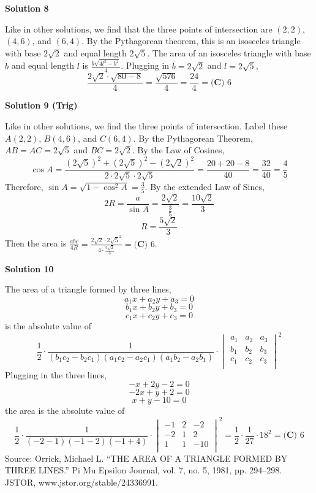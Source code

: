 \begin{enumerate}
\textbf{Solution 8}

Like in other solutions, we find that the three points of intersection are $(2, 2)$, $(4, 6)$, and $(6, 4)$. By the Pythagorean theorem, this is an isosceles triangle with base $2\sqrt2$ and equal length $2\sqrt5$. The area of an isosceles triangle with base $b$ and equal length $l$ is $\frac{b\sqrt{4l^2-b^2}}{4}$. Plugging  in $b = 2\sqrt2$ and $l = 2\sqrt5$,
 \[\frac{2\sqrt2 \cdot \sqrt{80-8}}{4} = \frac{\sqrt{576}}{4} = \frac{24}{4} = \boxed{\textbf{(C) }6}\]




\textbf{Solution 9 (Trig)}

Like in other solutions, we find the three points of intersection. Label these $A (2, 2)$, $B (4, 6)$, and $C (6, 4)$. By the Pythagorean Theorem, $AB = AC = 2\sqrt5$ and $BC = 2\sqrt2$. By the Law of Cosines,
 \[\cos A = \frac{(2\sqrt5)^2 + (2\sqrt5)^2 - (2\sqrt2)^2}{2 \cdot 2\sqrt5 \cdot 2\sqrt5} = \frac{20 + 20 - 8}{40} = \frac{32}{40} = \frac45\]Therefore, $\sin A = \sqrt{1 - \cos^2 A} = \frac35$. By the extended Law of Sines,
 \[2R = \frac{a}{\sin A} = \frac{2\sqrt2}{\frac35} = \frac{10\sqrt2}{3}\]
 \[R = \frac{5\sqrt2}{3}\]Then the area is $\frac{abc}{4R} = \frac{2\sqrt2 \cdot 2\sqrt5^2}{4 \cdot \frac{5\sqrt2}{3}} = \boxed{\textbf{(C) }6}$.

 



\textbf{Solution 10}

The area of a triangle formed by three lines,
 \[a_1x + a_2y + a_3 = 0\]
 \[b_1x + b_2y + b_3 = 0\]
 \[c_1x + c_2y + c_3 = 0\]is the absolute value of
 \[\frac12 \cdot \frac{1}{(b_1c_2-b_2c_1)(a_1c_2-a_2c_1)(a_1b_2-a_2b_1)} \cdot \begin{vmatrix} a_1&a_2&a_3\\ b_1&b_2&b_3\\ c_1&c_2&c_3\\ \end{vmatrix}^2\]Plugging in the three lines,
 \[-x + 2y - 2 = 0\]
 \[-2x + y + 2 = 0\]
 \[x + y - 10 = 0\]the area is the absolute value of
 \[\frac12 \cdot \frac{1}{(-2-1)(-1-2)(-1+4)} \cdot \begin{vmatrix} -1&2&-2\\ -2&1&2\\ 1&1&-10\\ \end{vmatrix}^2 = \frac12 \cdot \frac{1}{27} \cdot 18^2 = \boxed{\textbf{(C) }6}\]Source: Orrick, Michael L. “THE AREA OF A TRIANGLE FORMED BY THREE LINES.” Pi Mu Epsilon Journal, vol. 7, no. 5, 1981, pp. 294–298. JSTOR, www.jstor.org/stable/24336991.


\end{enumerate}
